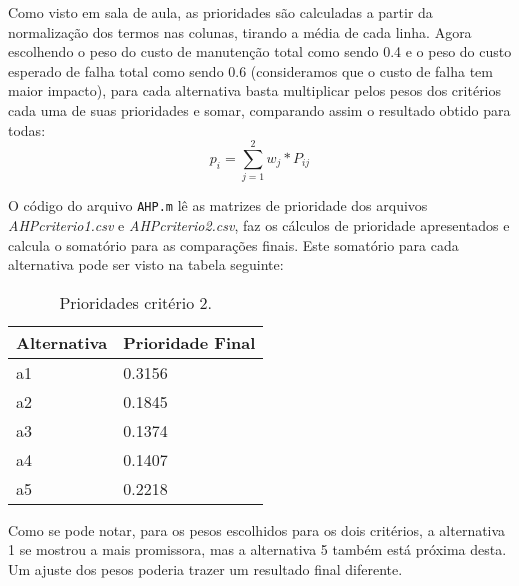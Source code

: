 Como visto em sala de aula, as prioridades são calculadas a partir da normalização dos termos nas colunas, tirando a média de cada linha. Agora escolhendo o peso do custo de manutenção total como sendo 0.4 e o peso do custo esperado de falha total como sendo 0.6 (consideramos que o custo de falha tem maior impacto), para cada alternativa basta multiplicar pelos pesos dos critérios cada uma de suas prioridades e somar, comparando assim o resultado obtido para todas:
\begin{equation}
p_i = \sum_{j=1}^{2} w_j*P_{ij}
\label{sum_cm}
\end{equation}

O código do arquivo \texttt{AHP.m} lê as matrizes de prioridade dos arquivos \textit{AHPcriterio1.csv} e \textit{AHPcriterio2.csv}, faz os cálculos de prioridade apresentados e calcula o somatório para as comparações finais. Este somatório para cada alternativa pode ser visto na tabela seguinte:
\begin{table}[h]
	\centering
	\begin{tabular}{ | l | l | }
		\hline
		Alternativa & Prioridade Final \\ \hline
		a1 & 0.3156 \\ \hline
		a2 & 0.1845 \\ \hline
		a3 & 0.1374 \\ \hline
		a4 & 0.1407 \\ \hline
		a5 & 0.2218 \\ \hline
	\end{tabular}
	\label{table:ahp-result}
	\caption{Prioridades critério 2.}
\end{table}

Como se pode notar, para os pesos escolhidos para os dois critérios, a alternativa 1 se mostrou a mais promissora, mas a alternativa 5 também está próxima desta. Um ajuste dos pesos poderia trazer um resultado final diferente.